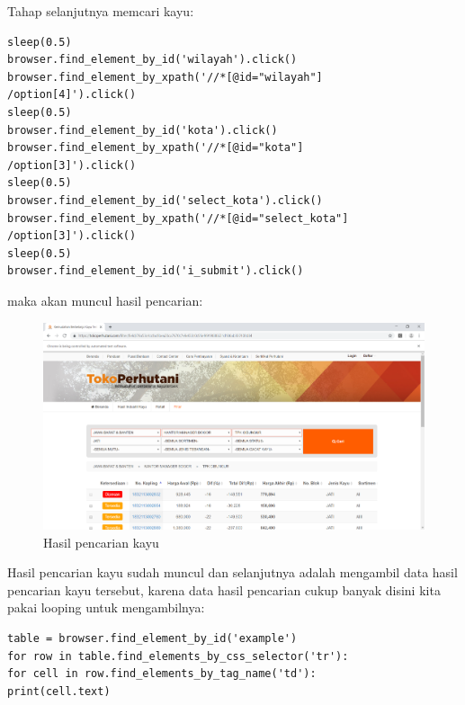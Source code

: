 Tahap selanjutnya memcari kayu:
 
\begin{verbatim}
sleep(0.5)
browser.find_element_by_id('wilayah').click()
browser.find_element_by_xpath('//*[@id="wilayah"]
/option[4]').click()
sleep(0.5)
browser.find_element_by_id('kota').click()
browser.find_element_by_xpath('//*[@id="kota"]
/option[3]').click()
sleep(0.5)
browser.find_element_by_id('select_kota').click()
browser.find_element_by_xpath('//*[@id="select_kota"]
/option[3]').click()
sleep(0.5)
browser.find_element_by_id('i_submit').click()
\end{verbatim}
\newpage
maka akan muncul hasil pencarian:
\begin{figure}[h]
	\centering
	\includegraphics[scale=0.27]{figures/7carikayu}
	\caption{Hasil pencarian kayu}
\end{figure}

Hasil pencarian kayu sudah muncul dan selanjutnya adalah mengambil data hasil pencarian kayu tersebut, karena data hasil pencarian cukup banyak disini kita pakai looping untuk mengambilnya:
\begin{verbatim}
table = browser.find_element_by_id('example')
for row in table.find_elements_by_css_selector('tr'):
for cell in row.find_elements_by_tag_name('td'):
print(cell.text)
\end{verbatim}

